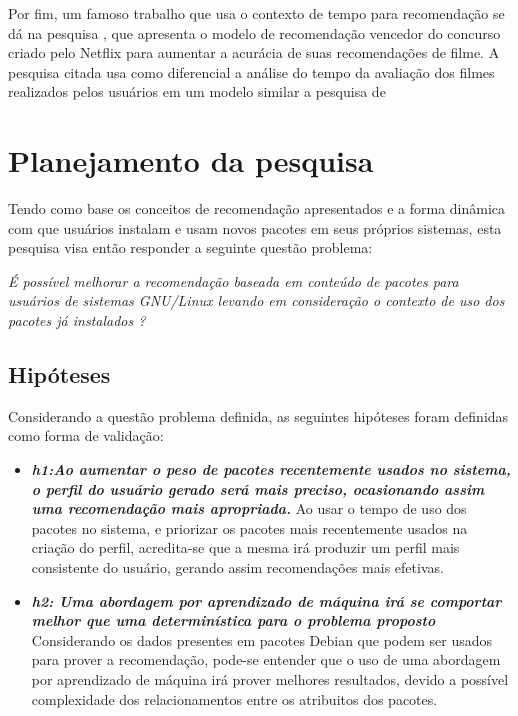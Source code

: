 Por fim, um famoso trabalho que usa o contexto de tempo para recomendação se dá na pesquisa \cite{koren2010collaborative}, que apresenta o modelo de recomendação vencedor
do concurso criado pelo Netflix para aumentar a acurácia de suas recomendações de filme. A pesquisa citada usa como diferencial a análise do tempo da avaliação dos filmes
realizados pelos usuários em um modelo similar a pesquisa de \cite{basile2015modeling}


\section{Planejamento da pesquisa}

Tendo como base os conceitos de recomendação apresentados e a forma dinâmica com
que usuários instalam e usam novos pacotes em seus próprios sistemas, esta
pesquisa visa então responder a seguinte questão problema:

\begin{center}
\textit{É possível melhorar a recomendação baseada em conteúdo de pacotes para
usuários de sistemas GNU/Linux levando em consideração o contexto de uso dos pacotes já instalados ?}
\end{center}

\subsection{Hipóteses} \label{sec:hipoteses}

Considerando a questão problema definida, as seguintes hipóteses foram definidas
como forma de validação:

\begin{itemize} \item \textit{\textbf{h1:Ao aumentar o peso de pacotes
recentemente usados no sistema, o perfil do usuário gerado será mais preciso,
ocasionando assim uma recomendação mais apropriada.}} Ao usar o tempo de uso dos
pacotes no sistema, e priorizar os pacotes mais recentemente usados na criação
do perfil, acredita-se que a mesma irá produzir um perfil mais
consistente do usuário, gerando assim recomendações mais efetivas.\item
\textit{\textbf{h2: Uma abordagem por aprendizado de máquina irá se comportar melhor
que uma determinística para o problema proposto}}
Considerando os dados presentes em pacotes Debian que podem ser
usados para prover a recomendação, pode-se entender que o uso de uma abordagem
por aprendizado de máquina irá prover melhores resultados, devido a possível
complexidade dos relacionamentos entre os atribuitos dos pacotes.
\end{itemize}

